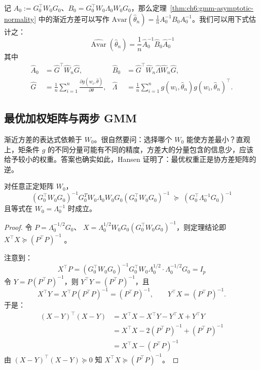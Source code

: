 记 $A_0:=G_0^\top W_0 G_0$、$B_0=G_0^\top W_0\Lambda_0 W_0G_0$，那么定理~\ref{thm:ch6:gmm-asymptotic-normality} 中的渐近方差可以写作 $\mathrm{Avar}(\widehat\theta_n)=\tfrac1n A_0^{-1}B_0A_0^{-1}$。我们可以用下式估计之： \[\widehat{\operatorname{Avar}}(\widehat{\theta}_n) = \frac{1}{n} \widehat{A}_0^{-1} \widehat{B}_0 \widehat{A}_0^{-1}\]
其中\[\begin{aligned}
\widehat{A}_0 &= \widehat{G}^\top\widehat{W}_n \widehat{G},
&\widehat{B}_0 &= \widehat{G}^\top \widehat{W}_n \widehat{\Lambda}\widehat{W}_n \widehat{G},\\
\widehat{G} &= \frac{1}{n}\sum_{i=1}^n \frac{\partial g(w_i,\widehat{\theta})}{\partial\theta},
&\widehat{\Lambda} &= \frac{1}{n}\sum_{i=1}^n g(w_i,\widehat{\theta}_n) g(w_i,\widehat{\theta}_n)^\top.
\end{aligned}\]
\subsection{最优加权矩阵与两步 GMM}

渐近方差的表达式依赖于 $W_0$。很自然要问：选择哪个 $W_0$ 能使方差最小？直观上，矩条件 $g$ 的不同分量可能有不同的精度，方差大的分量包含的信息少，应该给予较小的权重。答案也确实如此，Hansen 证明了：最优权重正是协方差矩阵的逆。

\begin{theorem}
\label{thm:ch6:gmm-optimal-weight}

对任意正定矩阵 $W_0$，
\[(G_0^\top W_0 G_0)^{-1} G_0^T W_0 \Lambda_0 W_0 G_0 (G_0^\top W_0 G_0)^{-1} \;\succeq\; (G_0^\top \Lambda_0^{-1} G_0)^{-1}\]
且等式在 $W_0 = \Lambda_0^{-1}$ 时成立。

\end{theorem}

\begin{proof}

令 $P = \Lambda_0^{-1/2} G_0$、 $X = \Lambda_0^{1/2} W_0 G_0 (G_0^\top W_0 G_0)^{-1}$，则定理结论即 $X^\top X\succeq (P^\top P)^{-1}$ 。

注意到：
\[X^\top P = (G_0^\top W_0 G_0)^{-1} G_0^\top W_0 \Lambda_0^{1/2} \cdot \Lambda_0^{-1/2} G_0 = I_p\]
令 $Y = P(P^\top P)^{-1}$，则 $Y^\top Y = (P^\top P)^{-1}$，且
\[X^\top Y = X^\top P (P^\top P)^{-1} = (P^\top P)^{-1},\qquad Y^\top X = (P^\top P)^{-1}.\]
于是：
\[\begin{aligned} (X - Y)^\top (X - Y) &= X^\top X - X^\top Y - Y^\top X + Y^\top Y \\ &= X^\top X - 2(P^\top P)^{-1} + (P^\top P)^{-1} \\ &= X^\top X - (P^\top P)^{-1} \end{aligned}\]
由 $(X - Y)^\top (X - Y) \succeq 0$ 知 $X^\top X \succeq (P^\top P)^{-1}$。

\end{proof}

